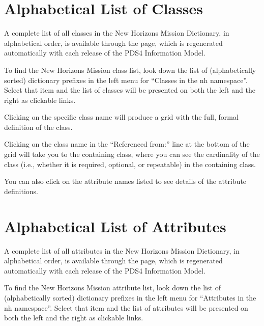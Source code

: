 \documentclass[letterpaper,10pt,english]{sphinxmanual}
\begin{document}
\sphinxstepscope


\chapter{Alphabetical List of Classes}
\label{\detokenize{detailed/classList:alphabetical-list-of-classes}}\label{\detokenize{detailed/classList::doc}}
\sphinxAtStartPar
A complete list of all classes in the New Horizons Mission Dictionary, in alphabetical
order, is available through the 
page, which is regenerated automatically with each release of the PDS4 Information Model.

\sphinxAtStartPar
To find the New Horizons Mission class list, look down the list of (alphabetically sorted)
dictionary prefixes in the left menu for “Classes in the nh namespace”.
Select that item and the list of classes will be presented on both the left and
the right as clickable links.

\sphinxAtStartPar
Clicking on the specific class name will produce a grid with the full, formal
definition of the class.

\sphinxAtStartPar
Clicking on the class name in the “Referenced from:” line at the bottom of the
grid will take you to the containing class, where you can see the cardinality
of the class (i.e., whether it is required, optional, or repeatable) in the
containing class.

\sphinxAtStartPar
You can also click on the attribute names listed to see details of the
attribute definitions.

\sphinxstepscope


\chapter{Alphabetical List of Attributes}
\label{\detokenize{detailed/attributeList:alphabetical-list-of-attributes}}\label{\detokenize{detailed/attributeList::doc}}
\sphinxAtStartPar
A complete list of all attributes in the New Horizons Mission Dictionary, in alphabetical
order, is available through the 
page, which is regenerated automatically with each release of the PDS4 Information Model.

\sphinxAtStartPar
To find the New Horizons Mission attribute list, look down the list of (alphabetically sorted)
dictionary prefixes in the left menu for “Attributes in the nh namespace”.
Select that item and the list of attributes will be presented on both the left and the
right as clickable links.
\end{document}

